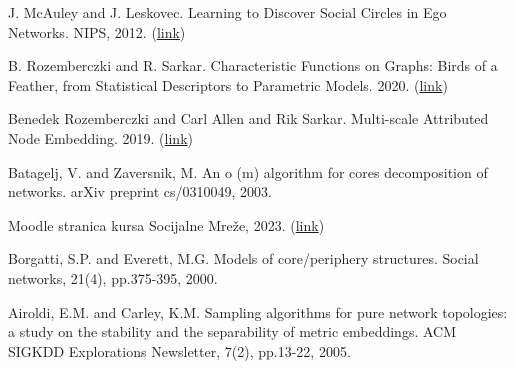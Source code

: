 \documentclass[11pt,a4paper]{article}
\begin{document}
\begin{thebibliography}{9}

J. McAuley and J. Leskovec. Learning to Discover Social Circles in Ego Networks. NIPS, 2012. (\href{https://snap.stanford.edu/data/ego-Facebook.html}{link})

B. Rozemberczki and R. Sarkar. Characteristic Functions on Graphs: Birds of a Feather, from Statistical Descriptors to Parametric Models. 2020. (\href{https://snap.stanford.edu/data/feather-deezer-social.html}{link})

Benedek Rozemberczki and Carl Allen and Rik Sarkar. Multi-scale Attributed Node Embedding. 2019. (\href{https://snap.stanford.edu/data/twitch-social-networks.html}{link})

Batagelj, V. and Zaversnik, M. An o (m) algorithm for cores decomposition of networks. arXiv preprint cs/0310049, 2003.

Moodle stranica kursa Socijalne Mre\v ze, 2023. (\href{https://moodle.pmf.uns.ac.rs/course/view.php?id=591}{link})

Borgatti, S.P. and Everett, M.G. Models of core/periphery structures. Social networks, 21(4), pp.375-395, 2000.

Airoldi, E.M. and Carley, K.M. Sampling algorithms for pure network topologies: a study on the stability and the separability of metric embeddings. ACM SIGKDD Explorations Newsletter, 7(2), pp.13-22, 2005.

\end{thebibliography}
\end{document}
